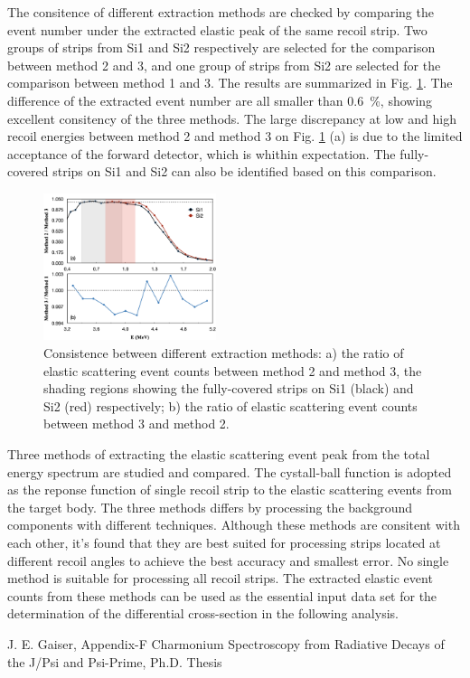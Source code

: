 \documentclass[fleqn,twocolumn,a4paper]{ikpar}
\begin{document}
The consitence of different extraction methods are checked by comparing the event
number under the extracted elastic peak of the same recoil strip.
Two groups of strips from Si1 and Si2 respectively are selected for the
comparison between method 2 and 3, and one group of strips from Si2 are selected
for the comparison between method 1 and 3.
The results are summarized in Fig. \ref{fig:extraction_consistence}.
The difference of the extracted event number are all smaller than \SI{0.6}{\percent},
showing excellent consitency of the three methods.
The large discrepancy at low and high recoil energies between method 2 and
method 3 on Fig. \ref{fig:extraction_consistence} (a) is due to the limited
acceptance of the forward detector, which is whithin expectation.
The fully-covered strips on Si1 and Si2 can also be identified based on this comparison.
\begin{figure}[!htb]
	\includegraphics[width=0.45\textwidth]{./comparison_methods.png}
  \caption{Consistence between different extraction
    methods: a) the ratio of elastic scattering event counts between method 2 and
    method 3, the shading regions showing the fully-covered strips on Si1
    (black) and Si2 (red) respectively; b) the ratio of elastic scattering event counts between method 3 and
    method 2.}
  \label{fig:extraction_consistence}
\end{figure}

\par
\medskip

Three methods of extracting the elastic scattering event peak from the total
energy spectrum are studied and compared.
The cystall-ball function is adopted as the reponse function of single recoil strip to the
elastic scattering events from the target body.
The three methods differs by processing the background components with different techniques.
Although these methods are consitent with each other, it's found that they are best suited for
processing strips located at different recoil angles to achieve the best accuracy
and smallest error.
No single method is suitable for processing all recoil strips.
The extracted elastic event counts from these methods can be used as
the essential input data set for the determination of the differential cross-section in the following analysis.

\par
\medskip

\begin{thebibliography}{99}
 J. E. Gaiser, Appendix-F Charmonium Spectroscopy from Radiative Decays of the J/Psi and Psi-Prime, Ph.D. Thesis
\end{thebibliography}
\end{document}
